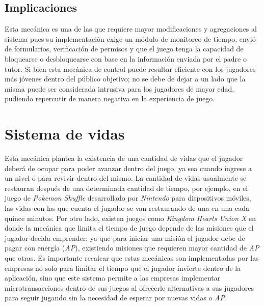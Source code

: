 \subsection{Implicaciones}
Esta mecánica es una de las que requiere mayor modificaciones y agregaciones al 
sistema pues su implementación exige un módulo de monitoreo de tiempo, envió de 
formularios, verificación de permisos y que el juego tenga la capacidad de 
bloquearse o desbloquearse con base en la información enviada por el padre o 
tutor. Si bien esta mecánica de control puede resultar eficiente con los 
jugadores más jóvenes dentro del público objetivo; no se debe de dejar a un lado 
que la misma puede ser considerada intrusiva para los jugadores de mayor edad, 
pudiendo repercutir de manera negativa en la experiencia de juego. 

\section{Sistema de vidas}
Esta mecánica plantea la existencia de una cantidad de vidas que el jugador 
deberá de ocupar para poder avanzar dentro del juego, ya sea cuando ingrese a un 
nivel o para revivir dentro del mismo. La cantidad de vidas usualmente se 
restauran después de una determinada cantidad de tiempo, por ejemplo, en el 
juego de \textit{Pokemon Shuffle} desarrollado por \textit{Nintendo} para 
dispositivos móviles, las vidas con las que cuenta el jugador se van restaurando 
de una en una cada quince minutos.  Por otro lado, existen juegos como\textit{ 
Kingdom Hearts Union X} en donde la mecánica que limita el tiempo de juego 
depende de las misiones que el jugador decida emprender; ya que para iniciar una 
misión el jugador debe de pagar con energía (\textit{AP}), existiendo misiones 
que requieren mayor cantidad de \textit{AP} que otras. Es importante recalcar 
que estas mecánicas son implementadas por las empresas no solo para limitar el 
tiempo que el jugador invierte dentro de la aplicación, sino que este sistema 
permite a las empresas implementar microtransacciones dentro de sus juegos al 
ofrecerle alternativas a sus jugadores para seguir jugando sin la necesidad de 
esperar por nuevas vidas o \textit{AP.}  
